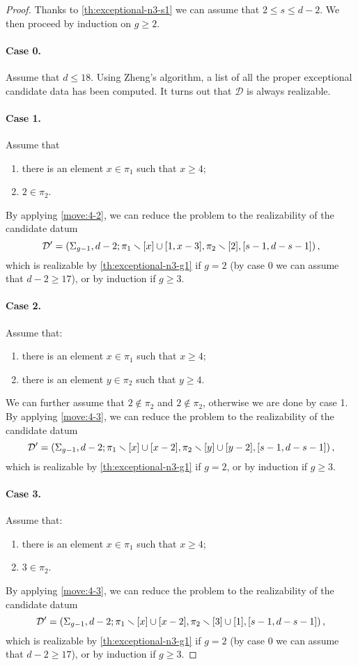 \documentclass{article}
\begin{document}
\begin{proof}
Thanks to \cref{th:exceptional-n3-s1} we can assume that $2\le s\le d-2$. We then proceed by induction on $g\ge 2$.

\paragraph{Case 0.} Assume that $d\le 18$. Using Zheng's algorithm, a list of all the proper exceptional candidate data has been computed. It turns out that $\mathcal{D}$ is always realizable.

\paragraph{Case 1.} Assume that
\begin{enumerate}
\item there is an element $x\in\pi_1$ such that $x\ge 4$;
\item $2\in\pi_2$.
\end{enumerate}
By applying \cref{move:4-2}, we can reduce the problem to the realizability of the candidate datum
\[
\mathcal{D}'=\left(\Sigma_{g-1},d-2;\pi_1\smallsetminus[x]\cup[1,x-3],\pi_2\smallsetminus[2],[s-1,d-s-1]\right),
\]
which is realizable by \cref{th:exceptional-n3-g1} if $g=2$ (by case 0 we can assume that $d-2\ge 17$), or by induction if $g\ge 3$.

\paragraph{Case 2.} Assume that:
\begin{enumerate}
\item there is an element $x\in\pi_1$ such that $x\ge 4$;
\item there is an element $y\in\pi_2$ such that $y\ge 4$.
\end{enumerate}
We can further assume that $2\not\in\pi_2$ and $2\not\in\pi_2$, otherwise we are done by case 1. By applying \cref{move:4-3}, we can reduce the problem to the realizability of the candidate datum
\[
\mathcal{D}'=\left(\Sigma_{g-1},d-2;\pi_1\smallsetminus[x]\cup[x-2],\pi_2\smallsetminus[y]\cup[y-2],[s-1,d-s-1]\right),
\]
which is realizable by \cref{th:exceptional-n3-g1} if $g=2$, or by induction if $g\ge 3$.

\paragraph{Case 3.} Assume that:
\begin{enumerate}
\item there is an element $x\in\pi_1$ such that $x\ge 4$;
\item $3\in\pi_2$.
\end{enumerate}
By applying \cref{move:4-3}, we can reduce the problem to the realizability of the candidate datum
\[
\mathcal{D}'=\left(\Sigma_{g-1},d-2;\pi_1\smallsetminus[x]\cup[x-2],\pi_2\smallsetminus[3]\cup[1],[s-1,d-s-1]\right),
\]
which is realizable by \cref{th:exceptional-n3-g1} if $g=2$ (by case 0 we can assume that $d-2\ge 17$), or by induction if $g\ge 3$.


\end{proof}
\end{document}
